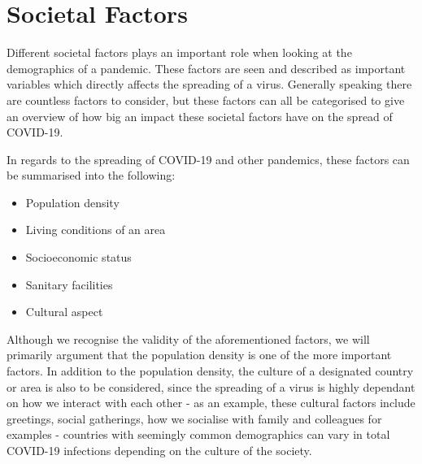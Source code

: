 \section{Societal Factors}

Different societal factors plays an important role when looking at the demographics of a pandemic. These factors are seen and described as important variables which directly affects the spreading of a virus. Generally speaking there are countless factors to consider, but these factors can all be categorised to give an overview of how big an impact these societal factors have on the spread of COVID-19. 

In regards to the spreading of COVID-19 and other pandemics, these factors can be summarised into the following:

\begin{itemize}
    \item Population density 
    \item Living conditions of an area
    \item Socioeconomic status 
    \item Sanitary facilities 
    \item Cultural aspect
\end{itemize}

Although we recognise the validity of the aforementioned factors, we will primarily argument that the population density is one of the more important factors. \citep{who_listings_nodate} In addition to the population density, the culture of a designated country or area is also to be considered, since the spreading of a virus is highly dependant on how we interact with each other - as an example, these cultural factors include greetings, social gatherings, how we socialise with family and colleagues for examples - countries with seemingly common demographics can vary in total COVID-19 infections depending on the culture of the society.\citep{fanelli_analysis_2020}

